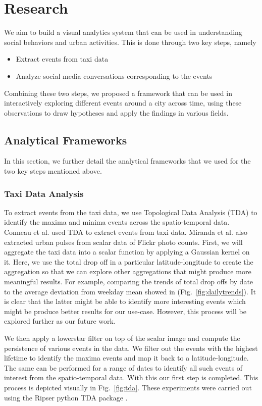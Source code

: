 \section{Research}

We aim to build a visual analytics system that can be used in understanding social behaviors and urban activities. This is done through two key steps, namely

\begin{itemize}
\item Extract events from taxi data
\item Analyze social media conversations corresponding to the events
\end{itemize}

Combining these two steps, we proposed a framework that can be used in interactively exploring different events around a city across time, using these observations to draw hypotheses and apply the findings in various fields.

\subsection{Analytical Frameworks}
In this section, we further detail the analytical frameworks that we used for the two key steps mentioned above.

\subsubsection{Taxi Data Analysis}
To extract events from the taxi data, we use Topological Data Analysis (TDA) to identify the maxima and minima events across the spatio-temporal data. Conneau et al. \cite{xlmroberta} used TDA to extract events from taxi data. Miranda et al. \cite{miranda2017Urban} also extracted urban pulses from scalar data of Flickr photo counts. First, we will aggregate the taxi data into a scalar function by applying a Gaussian kernel on it. Here, we use the total drop off in a particular latitude-longitude to create the aggregation so that we can explore other aggregations that might produce more meaningful results. For example, comparing the trends of total drop offs by date to the average deviation from weekday mean showed in (Fig.~\ref{fig:dailytrends}). It is clear that the latter might be able to identify more interesting events which might be produce better results for our use-case. However, this process will be explored further as our future work.

We then apply a lowerstar filter on top of the scalar image and compute the persistence of various events in the data. We filter out the events with the highest lifetime to identify the maxima events and map it back to a latitude-longitude. The same can be performed for a range of dates to identify all such events of interest from the spatio-temporal data. With this our first step is completed. This process is depicted visually in Fig.~\ref{fig:tda}. These experiments were carried out using the Ripser python TDA package \cite{ripser}.


